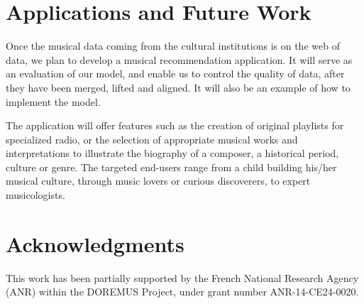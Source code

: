 \documentclass{llncs}
\begin{document}
\section{Applications and Future Work}
\label{sec:applications}

Once the musical data coming from the cultural institutions is on the web of data, we plan to develop a musical recommendation application. It will serve as an evaluation of our model, and enable us to control the quality of data, after they have been merged, lifted and aligned. It will also be an example of how to implement the model.

The application will offer features such as the creation of original playlists for specialized radio, or the selection of appropriate musical works and interpretations to illustrate the biography of a composer, a historical period, culture or genre. The targeted end-users range from a child building his/her musical culture, through music lovers or curious discoverers, to expert musicologists.


\section*{Acknowledgments}
This work has been partially supported by the French National Research Agency (ANR) within the DOREMUS Project, under grant number ANR-14-CE24-0020.



\end{document}
